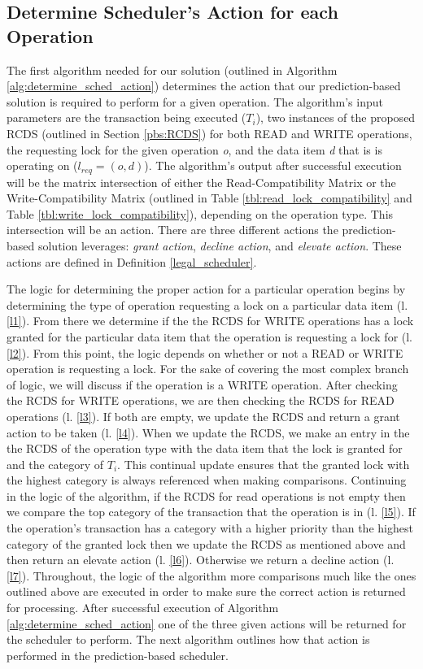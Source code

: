 \subsection{Determine Scheduler's Action for each Operation}
\label{pbs:determine_sched_actions}
The first algorithm needed for our solution (outlined in Algorithm \ref{alg:determine_sched_action}) determines the action that our prediction-based solution is required to perform for a given operation. The algorithm's input parameters are the transaction being executed ($T_{i}$), two instances of the proposed RCDS (outlined in Section \ref{pbs:RCDS}) for both READ and WRITE operations, the requesting lock for the given operation \textit{o}, and the data item \textit{d} that is is operating on ($l_{req} = (o,d)$). The algorithm's output after successful execution will be the matrix intersection of either the Read-Compatibility Matrix or the Write-Compatibility Matrix (outlined in Table \ref{tbl:read_lock_compatibility} and Table \ref{tbl:write_lock_compatibility}), depending on the operation type. This intersection will be an action. There are three different actions the prediction-based solution leverages: \textit{grant action}, \textit{decline action}, and \textit{elevate action}. These actions are defined in Definition \ref{legal_scheduler}.

The logic for determining the proper action for a particular operation begins by determining the type of operation requesting a lock on a particular data item (l. \ref{l1}). From there we determine if the the RCDS for WRITE operations has a lock granted for the particular data item that the operation is requesting a lock for (l. \ref{l2}). From this point, the logic depends on whether or not a READ or WRITE operation is requesting a lock. For the sake of covering the most complex branch of logic, we will discuss if the operation is a WRITE operation. After checking the RCDS for WRITE operations, we are then checking the RCDS for READ operations (l. \ref{l3}). If both are empty, we update the RCDS and return a grant action to be taken (l. \ref{l4}). When we update the RCDS, we make an entry in the the RCDS of the operation type with the data item that the lock is granted for and the category of $T_{i}$. This continual update ensures that the granted lock with the highest category is always referenced when making comparisons. Continuing in the logic of the algorithm, if the RCDS for read operations is not empty then we compare the top category of the transaction that the operation is in (l. \ref{l5}). If the operation's transaction has a category with a higher priority than the highest category of the granted lock then we update the RCDS as mentioned above and then return an elevate action (l. \ref{l6}). Otherwise we return a decline action (l. \ref{l7}). Throughout, the logic of the algorithm more comparisons much like the ones outlined above are executed in order to make sure the correct action is returned for processing. After successful execution of Algorithm \ref{alg:determine_sched_action} one of the three given actions will be returned for the scheduler to perform. The next algorithm outlines how that action is performed in the prediction-based scheduler.


